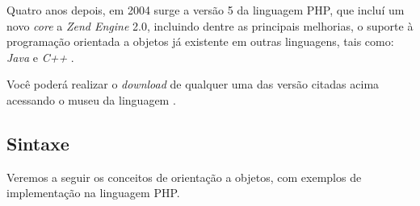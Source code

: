 Quatro anos depois, em 2004 surge a versão 5 da linguagem \acs{PHP}, que incluí
um novo \textit{core} a \textit{Zend Engine} 2.0, incluindo dentre as principais
melhorias, o suporte à programação orientada a objetos já existente
em outras linguagens, tais como: \textit{Java} e \textit{C++}
\cite{phpProgramandoComOrientacaoAObjetos}.

Você poderá realizar o \textit{download} de qualquer uma das versão citadas
acima acessando o museu da linguagem \cite{websitePHPMuseum}.

\subsection{Sintaxe}

Veremos a seguir os conceitos de orientação a objetos, com exemplos de
implementação na linguagem \acs{PHP}.